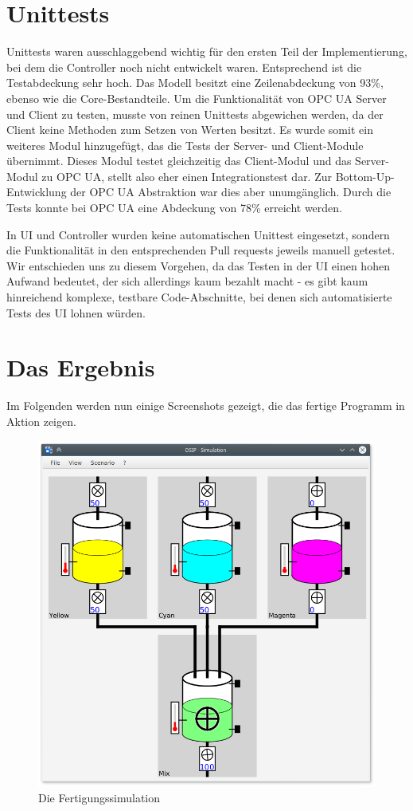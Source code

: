\documentclass[parskip=full]{scrartcl}
\begin{document}
\section{Unittests}
Unittests waren ausschlaggebend wichtig für den ersten Teil der Implementierung, bei dem die Controller noch nicht entwickelt waren.
Entsprechend ist die Testabdeckung sehr hoch. Das Modell besitzt eine Zeilenabdeckung von 93\%, ebenso wie die Core-Bestandteile.
Um die Funktionalität von OPC UA Server und Client zu testen, musste von reinen Unittests abgewichen werden, da der Client keine
Methoden zum Setzen von Werten besitzt. Es wurde somit ein weiteres Modul hinzugefügt, das die Tests der Server- und Client-Module übernimmt.
Dieses Modul testet gleichzeitig das Client-Modul und das Server-Modul zu OPC UA, stellt also eher einen Integrationstest dar. Zur Bottom-Up-Entwicklung der OPC UA Abstraktion war dies aber unumgänglich. Durch die Tests konnte bei OPC UA eine Abdeckung von 78\% erreicht werden.

In UI und Controller wurden keine automatischen Unittest eingesetzt, sondern die Funktionalität in den entsprechenden Pull requests
jeweils manuell getestet. Wir entschieden uns zu diesem Vorgehen, da das Testen in der UI einen hohen Aufwand bedeutet, der sich allerdings
kaum bezahlt macht - es gibt kaum hinreichend komplexe, testbare Code-Abschnitte, bei denen sich automatisierte Tests des UI lohnen würden.

\pagebreak
\section{Das Ergebnis}
Im Folgenden werden nun einige Screenshots gezeigt, die das fertige Programm in Aktion zeigen.

\begin{figure}[H]
    \centering
    \includegraphics[scale=0.55]{../media/screenshot-simulation.png}
    \caption{Die Fertigungssimulation}
\end{figure}
\end{document}
